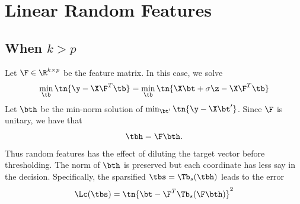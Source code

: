 \section{Linear Random Features}
\subsection{When $k>p$}
Let $\F\in\R^{k\times p}$ be the feature matrix. In this case, we solve
\[
\min_{\tb}\tn{\y-\X\F^T\tb}=\min_{\tb}\tn{\X\bt+\sigma\z-\X\F^T\tb}
\]
Let $\bth$ be the min-norm solution of $\min_{\bt'}\tn{\y-\X\bt'}$. Since $\F$ is unitary, we have that
\[
\tbh=\F\bth.
\]
Thus random features has the effect of diluting the target vector before thresholding. The norm of $\bth$ is preserved but each coordinate has less say in the decision. Specifically, the sparsified $\tbs=\Tb_s(\tbh)$ leads to the error
\[
\Lc(\tbs)=\tn{\bt-\F^T\Tb_s(\F\bth)}^2
\] 


















